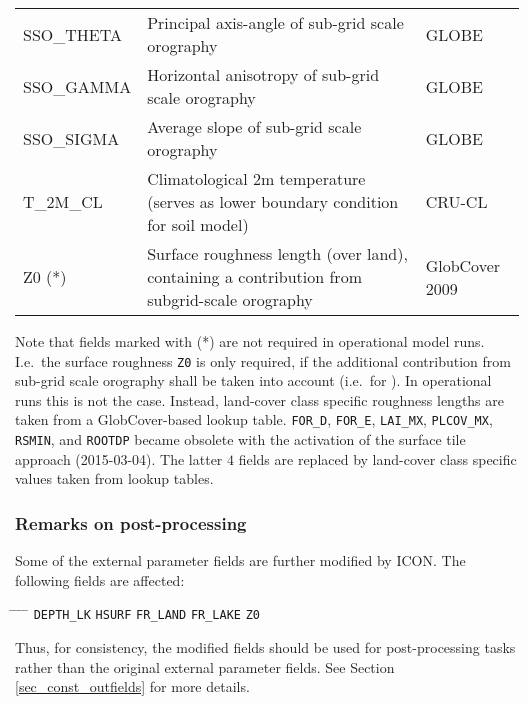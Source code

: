\begin{longtable}{p{2.5cm}p{8.5cm}p{3.3cm}}
  SSO\_THETA                            & Principal axis-angle of sub-grid scale orography &          \gls{GLOBE}     \\
  SSO\_GAMMA                            & Horizontal anisotropy of sub-grid scale orography &         \gls{GLOBE}     \\
  SSO\_SIGMA                            & Average slope of sub-grid scale orography       &           \gls{GLOBE}     \\
  T\_2M\_CL                             & Climatological 2m temperature (serves as lower boundary condition for soil model)  &  \gls{CRU-CL} \\
  Z0 (*)                                & Surface roughness length (over land), containing a contribution from subgrid-scale orography  & \gls{GlobCover 2009}    \\                        
  \bottomrule
\end{longtable}

Note that fields marked with (*) are not required in operational model runs. I.e.\ the surface roughness \texttt{Z0} is only required, 
if the additional contribution from sub-grid scale orography shall be taken into account (i.e.\ for ). In operational runs 
this is not the case. Instead, land-cover class specific roughness lengths are taken from a GlobCover-based lookup table. 
\texttt{FOR\_D}, \texttt{FOR\_E}, \texttt{LAI\_MX}, \texttt{PLCOV\_MX}, 
\texttt{RSMIN}, and \texttt{ROOTDP} became obsolete with the activation of the surface tile approach (2015-03-04). The latter $4$ fields 
are replaced by land-cover class specific values taken from lookup tables.



\subsubsection*{Remarks on post-processing}
Some of the external parameter fields are further modified by ICON. The following fields are affected: 
\begin{tabbing}
\hspace{0.20\textwidth} \= \hspace{0.20\textwidth} \= \hspace{0.20\textwidth} \= \hspace{0.20\textwidth} \= \hspace{0.20\textwidth} \kill
\texttt{DEPTH\_LK}  \>
\texttt{HSURF} \>
\texttt{FR\_LAND} \>
\texttt{FR\_LAKE} \>
\texttt{Z0}
\end{tabbing}
Thus, for consistency, the modified fields should be used for post-processing tasks rather than the original external parameter fields. 
See Section \ref{sec_const_outfields} for more details.
